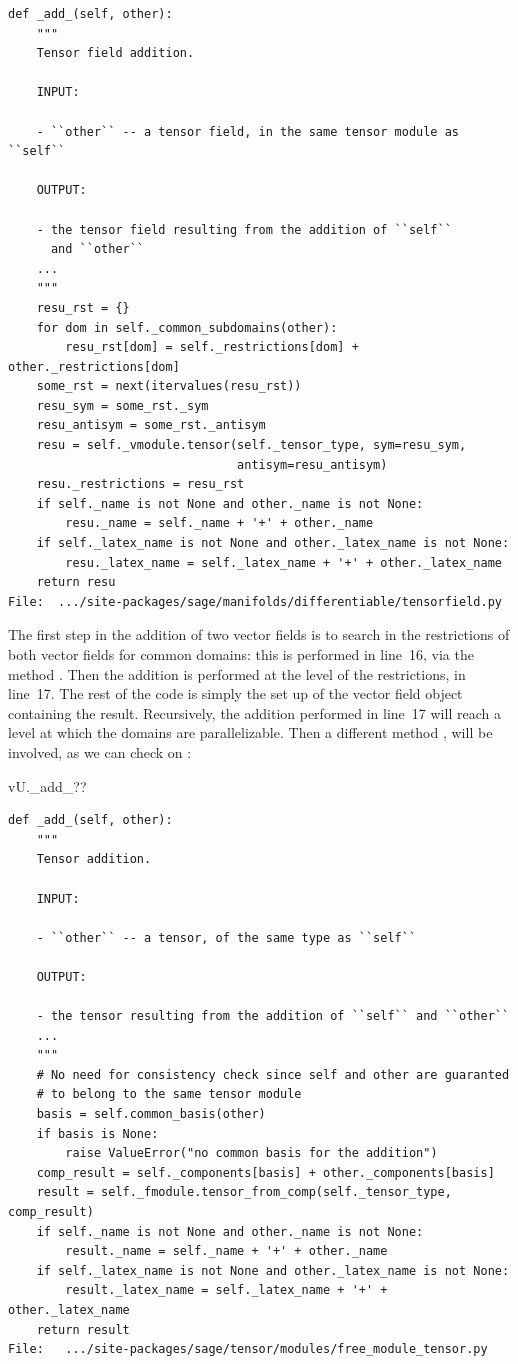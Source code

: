 \begin{lstlisting}
def _add_(self, other):
    """
    Tensor field addition.

    INPUT:

    - ``other`` -- a tensor field, in the same tensor module as ``self``

    OUTPUT:

    - the tensor field resulting from the addition of ``self``
      and ``other``
    ...
    """
    resu_rst = {}
    for dom in self._common_subdomains(other):
        resu_rst[dom] = self._restrictions[dom] + other._restrictions[dom]
    some_rst = next(itervalues(resu_rst))
    resu_sym = some_rst._sym
    resu_antisym = some_rst._antisym
    resu = self._vmodule.tensor(self._tensor_type, sym=resu_sym,
                                antisym=resu_antisym)
    resu._restrictions = resu_rst
    if self._name is not None and other._name is not None:
        resu._name = self._name + '+' + other._name
    if self._latex_name is not None and other._latex_name is not None:
        resu._latex_name = self._latex_name + '+' + other._latex_name
    return resu
File:  .../site-packages/sage/manifolds/differentiable/tensorfield.py
\end{lstlisting}
The first step in the addition of two vector fields is to search in the
restrictions of both vector fields for common domains: this is performed in
line~16, via the method . Then the addition is
performed at the level of the restrictions, in line~17. The rest of the code
is simply the set up of the vector field object containing the result.
Recursively, the addition performed in line~17 will reach a level at which
the domains are parallelizable. Then a different method , will
be involved, as we can check on :
\begin{NBin}
vU._add_??
\end{NBin}
\begin{lstlisting}
def _add_(self, other):
    """
    Tensor addition.

    INPUT:

    - ``other`` -- a tensor, of the same type as ``self``

    OUTPUT:

    - the tensor resulting from the addition of ``self`` and ``other``
    ...
    """
    # No need for consistency check since self and other are guaranted
    # to belong to the same tensor module
    basis = self.common_basis(other)
    if basis is None:
        raise ValueError("no common basis for the addition")
    comp_result = self._components[basis] + other._components[basis]
    result = self._fmodule.tensor_from_comp(self._tensor_type, comp_result)
    if self._name is not None and other._name is not None:
        result._name = self._name + '+' + other._name
    if self._latex_name is not None and other._latex_name is not None:
        result._latex_name = self._latex_name + '+' + other._latex_name
    return result
File:   .../site-packages/sage/tensor/modules/free_module_tensor.py
\end{lstlisting}

